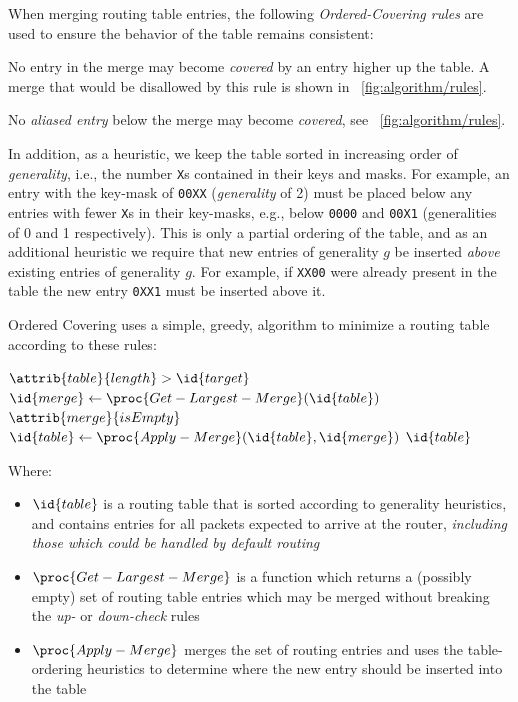 \documentclass[conference]{IEEEtran}
\newcommand{\mytt}[1]{\texttt{\footnotesize#1}}
\begin{document}
  When merging routing table entries, the following \textit{Ordered-Covering rules} are used to ensure the behavior of the table remains consistent:

  \begin{description}
    \item[\emph{Up-check} rule:]
      No entry in the merge may become \textit{covered} by an entry higher up the table.
      A merge that would be disallowed by this rule is shown in \figurename~\ref{fig:algorithm/rules}.
    \item[\emph{Down-check} rule:]
      No \textit{aliased entry} below the merge may become \textit{covered},
      see \figurename~\ref{fig:algorithm/rules}.
  \end{description}

    In addition, as a heuristic, we keep the table sorted in increasing order of \textit{generality}, i.e., the number \mytt{X}s contained in their keys and masks.
    For example, an entry with the key-mask of \mytt{00XX} (\textit{generality} of 2) must be placed below any entries with fewer \mytt{X}s in their key-masks, e.g., below \mytt{0000} and \mytt{00X1} (generalities of 0 and 1 respectively).
    This is only a partial ordering of the table, and as an additional heuristic we require that new entries of generality $g$ be inserted \emph{above} existing entries of generality $g$.
    For example, if \mytt{XX00} were already present in the table the new entry \mytt{0XX1} must be inserted above it.

  Ordered Covering uses a simple, greedy, algorithm to minimize a routing table according to these rules:\par\nopagebreak
  \begin{codebox}
    \li \While $\attrib{table}{length} >  \id{target}$
    \li \Do $\id{merge} \gets \proc{Get-Largest-Merge}(\id{table})$
    \li     \If $\attrib{merge}{isEmpty}$
    \li     \Then {} \End
    \li     $\id{table} \gets \proc{Apply-Merge}(\id{table}, \id{merge})$
        \End
    \li \Return $\id{table}$
  \end{codebox}

  \noindent Where:
  \begin{itemize}
    \item $\id{table}$ is a routing table that is sorted according to generality heuristics, and contains entries for all packets expected to arrive at the router, \textit{including those which could be handled by default routing}
    \item $\proc{Get-Largest-Merge}$ is a function which returns a (possibly empty) set of routing table entries which may be merged without breaking the \emph{up-} or \emph{down-check} rules
    \item $\proc{Apply-Merge}$ merges the set of routing entries and uses the table-ordering heuristics to determine where the new entry should be inserted into the table
  \end{itemize}
\end{document}

